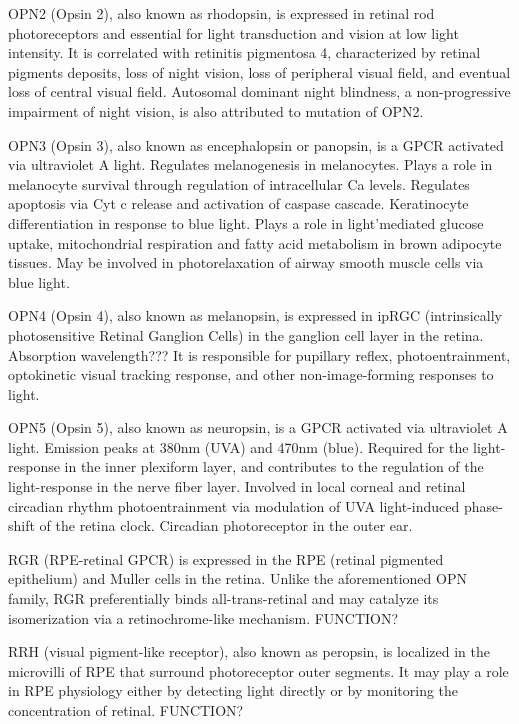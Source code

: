 \documentclass[fleqn,10pt,lineno]{manuscript}
\begin{document}
OPN2 (Opsin 2), also known as rhodopsin, is expressed in retinal rod photoreceptors and essential for light transduction and vision at low light intensity. It is correlated with retinitis pigmentosa 4, characterized by retinal pigments deposits, loss of night vision, loss of peripheral visual field, and eventual loss of central visual field. Autosomal dominant night blindness, a non-progressive impairment of night vision, is also attributed to mutation of OPN2. 

OPN3 (Opsin 3), also known as encephalopsin or panopsin, is a GPCR activated via ultraviolet A light. 
Regulates melanogenesis in melanocytes. 
Plays a role in melanocyte survival through regulation of intracellular Ca levels. 
Regulates apoptosis via Cyt c release and activation of caspase cascade. 
Keratinocyte differentiation in response to blue light. 
Plays a role in light'mediated glucose uptake, mitochondrial respiration and fatty acid metabolism in brown adipocyte tissues. 
May be involved in photorelaxation of airway smooth muscle cells via blue light. 

OPN4 (Opsin 4), also known as melanopsin, is expressed in ipRGC (intrinsically photosensitive Retinal Ganglion Cells) in the ganglion cell layer in the retina. Absorption wavelength??? It is responsible for pupillary reflex, photoentrainment, optokinetic visual tracking response, and other non-image-forming responses to light. 

OPN5 (Opsin 5), also known as neuropsin, is a GPCR activated via ultraviolet A light. 
Emission peaks at 380nm (UVA) and 470nm (blue). 
Required for the light-response in the inner plexiform layer, and contributes to the regulation of the light-response in the nerve fiber layer. 
Involved in local corneal and retinal circadian rhythm photoentrainment via modulation of UVA light-induced phase-shift of the retina clock. 
Circadian photoreceptor in the outer ear. 

RGR (RPE-retinal GPCR) is expressed in the RPE (retinal pigmented epithelium) and Muller cells in the retina. Unlike the aforementioned OPN family, RGR preferentially binds all-trans-retinal and may catalyze its isomerization via a retinochrome-like mechanism. FUNCTION?

RRH (visual pigment-like receptor), also known as peropsin, is localized in the microvilli of RPE that surround photoreceptor outer segments. It may play a role in RPE physiology either by detecting light directly or by monitoring the concentration of retinal. FUNCTION?
\end{document}
